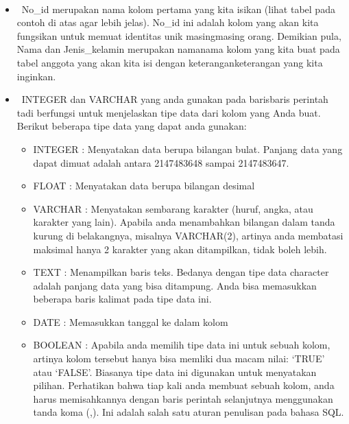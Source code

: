\documentclass[letterpaper,10pt,english]{sphinxmanual}
\begin{document}
 
\begin{itemize}
\item {} 
  No\_id merupakan nama kolom pertama yang kita isikan (lihat tabel pada contoh di atas agar lebih jelas). No\_id ini adalah kolom yang akan kita fungsikan untuk memuat identitas unik masing\sphinxhyphen{}masing orang. Demikian pula, Nama dan Jenis\_kelamin merupakan nama\sphinxhyphen{}nama kolom yang kita buat pada tabel anggota yang akan kita isi dengan keterangan\sphinxhyphen{}keterangan yang kita inginkan.

\item {} 
  INTEGER dan VARCHAR yang anda gunakan pada baris\sphinxhyphen{}baris perintah tadi berfungsi untuk menjelaskan tipe data dari kolom yang Anda buat. Berikut beberapa tipe data yang dapat anda gunakan:
\begin{itemize}
\item {} 
INTEGER		: Menyatakan data berupa bilangan bulat. Panjang data yang dapat dimuat adalah antara \sphinxhyphen{}2147483648 sampai 2147483647.

\item {} 
FLOAT		: Menyatakan data berupa bilangan desimal

\item {} 
VARCHAR	: Menyatakan sembarang karakter (huruf, angka, atau karakter yang lain). Apabila anda menambahkan bilangan dalam tanda kurung di belakangnya, misalnya VARCHAR(2), artinya anda membatasi maksimal hanya 2 karakter yang akan ditampilkan, tidak boleh lebih.

\item {} 
TEXT		: Menampilkan baris teks. Bedanya dengan tipe data character adalah panjang data yang bisa ditampung. Anda bisa memasukkan beberapa baris kalimat pada tipe data ini.

\item {} 
DATE		: Memasukkan tanggal ke dalam kolom

\item {} 
BOOLEAN	: Apabila anda memilih tipe data ini untuk sebuah kolom, artinya kolom tersebut hanya bisa memliki dua macam nilai: ‘TRUE’ atau ‘FALSE’. Biasanya tipe data ini digunakan untuk menyatakan pilihan.
Perhatikan bahwa tiap kali anda membuat sebuah kolom, anda harus memisahkannya dengan baris perintah selanjutnya menggunakan tanda koma (,). Ini adalah salah satu aturan penulisan pada bahasa SQL.

\end{itemize}

\end{itemize}
\end{document}

